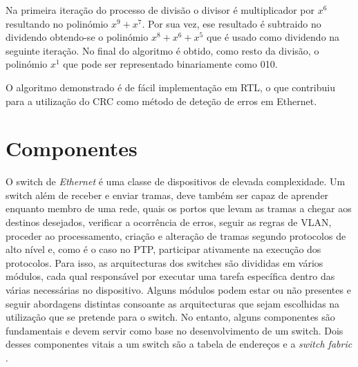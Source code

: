 Na primeira iteração do processo de divisão o divisor é multiplicador por \(x^{6}\) resultando no polinómio \(x^{9} + x^{7}\). Por sua vez, ese resultado é subtraido no dividendo obtendo-se o polinómio \(x^{8} + x^{6} + x^{5}\) que é usado como dividendo na seguinte iteração. No final do algoritmo é obtido, como resto da divisão, o polinómio \(x^{1}\) que pode ser representado binariamente como 010. \par
O algoritmo demonstrado é de fácil implementação em RTL, o que contribuiu para a utilização do CRC como método de deteção de erros em Ethernet.  



\section{Componentes}
\label{section:model}

O switch de \textit{Ethernet} é uma classe de dispositivos de elevada complexidade. Um switch além de receber e enviar tramas, deve também ser capaz de aprender enquanto membro de uma rede, quais os portos que levam as tramas a chegar aos destinos desejados, verificar a ocorrência de erros, seguir as regras de VLAN, proceder ao processamento, criação e alteração de tramas segundo protocolos de alto nível e, como é o caso no PTP, participar ativamente na execução dos protocolos. Para isso, as arquitecturas dos switches são divididas em vários módulos, cada qual responsável por executar uma tarefa específica dentro das várias necessárias no dispositivo. Alguns módulos podem estar ou não presentes e seguir abordagens distintas consoante as arquitecturas que sejam escolhidas na utilização que se pretende para o switch. No entanto, alguns componentes são fundamentais e devem servir como base no desenvolvimento de um switch. Dois desses componentes vitais a um switch são a tabela de endereços e a \textit{switch fabric} \cite{make}. \par
